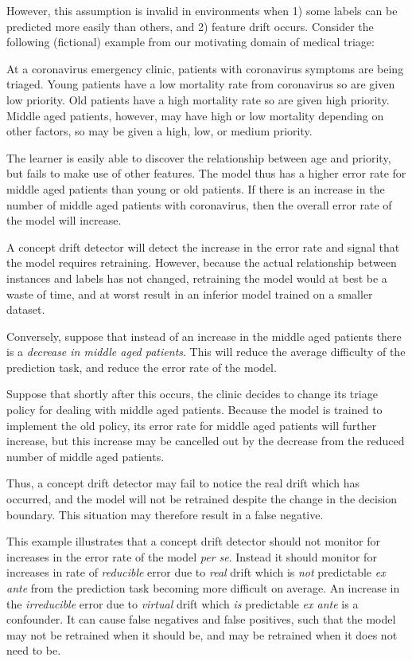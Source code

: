 \noindent However, this assumption is invalid in environments when 1) some labels can be predicted more easily than others, and 2) feature drift occurs. Consider the following (fictional) example from our motivating domain of medical triage:
\begin{displayquote}
    At a coronavirus emergency clinic, patients with coronavirus symptoms are being triaged. Young patients have a low mortality rate from coronavirus so are given low priority. Old patients have a high mortality rate so are given high priority. Middle aged patients, however, may have high or low mortality depending on other factors, so may be given a high, low, or medium priority. 
    
    The learner is easily able to discover the relationship between age and priority, but fails to make use of other features. The model thus has a higher error rate for middle aged patients than young or old patients. If there is an increase in the number of middle aged patients with coronavirus, then the overall error rate of the model will increase.  
    
    A concept drift detector will detect the increase in the error rate and signal that the model requires retraining. However, because the actual relationship between instances and labels has not changed, retraining the model would at best be a waste of time, and at worst result in an inferior model trained on a smaller dataset. 
    
    Conversely, suppose that instead of an increase in the middle aged patients there is a {\it decrease in middle aged patients}. This will reduce the average difficulty of the prediction task, and reduce the error rate of the model. 
    
    Suppose that shortly after this occurs, the clinic decides to change its triage policy for dealing with middle aged patients. Because the model is trained to implement the old policy, its error rate for middle aged patients will further increase, but this increase may be cancelled out by the decrease from the reduced number of middle aged patients. 
    
    Thus, a concept drift detector may fail to notice the real drift which has occurred, and the model will not be retrained despite the change in the decision boundary. This situation may therefore result in a false negative.
\end{displayquote}
This example illustrates that a concept drift detector should not monitor for increases in the error rate of the model {\it per se}. Instead it should monitor for increases in rate of {\it reducible} error due to {\it real} drift which is {\it not} predictable {\it ex ante} from the prediction task becoming more difficult on average. An increase in the {\it irreducible} error due to {\it virtual} drift which {\it is} predictable {\it ex ante} is a confounder. It can cause false negatives and false positives, such that the model may not be retrained when it should be, and may be retrained when it does not need to be.

